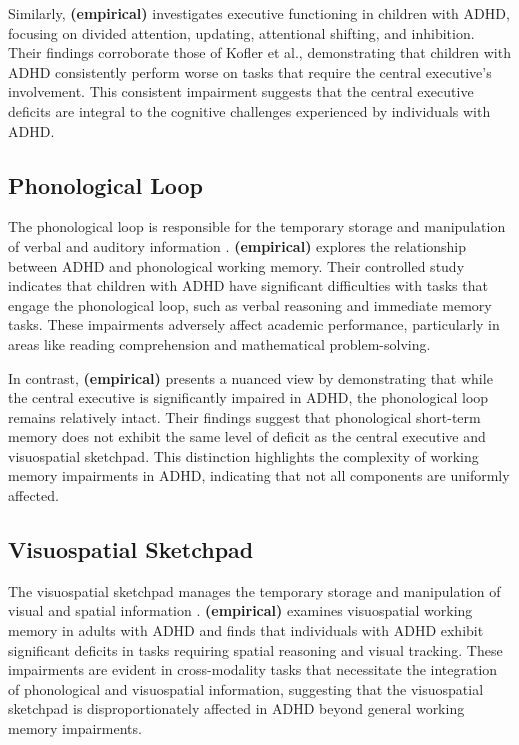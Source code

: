 \documentclass[stu]{apa7}
\begin{document}
Similarly, \textcite{elosua_differences_2017} \textbf{(empirical)} investigates executive functioning in children with ADHD, focusing on divided attention, updating, attentional shifting, and inhibition. Their findings corroborate those of Kofler et al., demonstrating that children with ADHD consistently perform worse on tasks that require the central executive's involvement. This consistent impairment suggests that the central executive deficits are integral to the cognitive challenges experienced by individuals with ADHD.

\subsection{Phonological Loop}

The phonological loop is responsible for the temporary storage and manipulation of verbal and auditory information \parencite{baddeley_developments_1994}. \textcite{fried_clinical_2016} \textbf{(empirical)} explores the relationship between ADHD and phonological working memory. Their controlled study indicates that children with ADHD have significant difficulties with tasks that engage the phonological loop, such as verbal reasoning and immediate memory tasks. These impairments adversely affect academic performance, particularly in areas like reading comprehension and mathematical problem-solving.

In contrast, \textcite{kofler_working_2020} \textbf{(empirical)} presents a nuanced view by demonstrating that while the central executive is significantly impaired in ADHD, the phonological loop remains relatively intact. Their findings suggest that phonological short-term memory does not exhibit the same level of deficit as the central executive and visuospatial sketchpad. This distinction highlights the complexity of working memory impairments in ADHD, indicating that not all components are uniformly affected.

\subsection{Visuospatial Sketchpad}

The visuospatial sketchpad manages the temporary storage and manipulation of visual and spatial information \parencite{baddeley_developments_1994}. \textcite{butzbach_basic_2019} \textbf{(empirical)} examines visuospatial working memory in adults with ADHD and finds that individuals with ADHD exhibit significant deficits in tasks requiring spatial reasoning and visual tracking. These impairments are evident in cross-modality tasks that necessitate the integration of phonological and visuospatial information, suggesting that the visuospatial sketchpad is disproportionately affected in ADHD beyond general working memory impairments.
\end{document}
